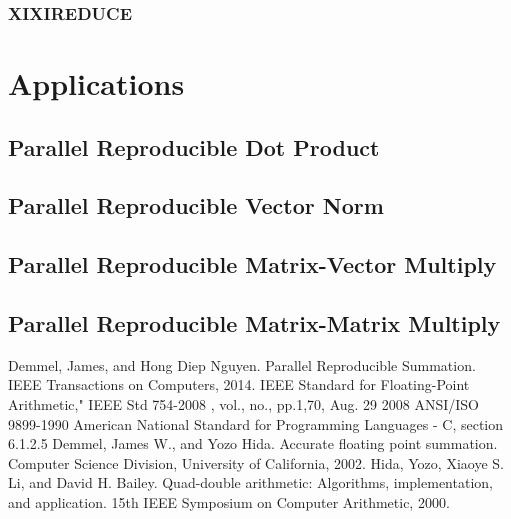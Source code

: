 \documentclass[12pt]{article}
\theoremstyle{plain}
\begin{document}
    \subsubsection{XIXIREDUCE}
\section{Applications}
  \subsection{Parallel Reproducible Dot Product}
  \subsection{Parallel Reproducible Vector Norm}
  \subsection{Parallel Reproducible Matrix-Vector Multiply}
  \subsection{Parallel Reproducible Matrix-Matrix Multiply}
\begin{thebibliography}{9}
    Demmel, James, and Hong Diep Nguyen. Parallel Reproducible Summation. IEEE Transactions on Computers, 2014.
    IEEE Standard for Floating-Point Arithmetic," IEEE Std 754-2008 , vol., no., pp.1,70, Aug. 29 2008
    ANSI/ISO 9899-1990 American National Standard for Programming Languages - C, section 6.1.2.5
    Demmel, James W., and Yozo Hida. Accurate floating point summation. Computer Science Division, University of California, 2002.
    Hida, Yozo, Xiaoye S. Li, and David H. Bailey. Quad-double arithmetic: Algorithms, implementation, and application. 15th IEEE Symposium on Computer Arithmetic, 2000.
\end{thebibliography}
\end{document}
